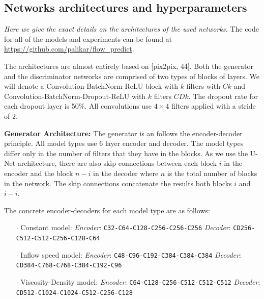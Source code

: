 \documentclass{llncs}
\begin{document}
\begin{subappendices}
\renewcommand{\thesection}{\Alph{section}}%

\section{Networks architectures and hyperparameters}
\label{app1}
\emph{Here we give the exact details on the architectures of the used networks.} The code for all of the models and experiments can be found at \url{https://github.com/palikar/flow_predict}.

The architectures are almost entirely based on [pix2pix, 44]. Both the generator and the discriminator networks are comprised of two types of blocks of layers. We will denote a Convolution-BatchNorm-ReLU block with $k$ filters with $Ck$ and Convolution-BatchNorm-Dropout-ReLU with $k$ filters $CDk$. The dropout rate for each dropout layer is 50\%. All convolutions use $4\times4$ filters applied with a stride of $2$.

\noindent\textbf{Generator Architecture:}
The generator is an follows the encoder-decoder principle. All model types use 6 layer encoder and decoder. The model types differ only in the number of filters that they have in the blocks. As we use the U-Net architecture, there are also skip connections between each block $i$ in the encoder and the block $n-i$ in the decoder where $n$ is the total number of blocks in the network. The skip connections concatenate the results both blocks $i$ and $i-i$.

The concrete encoder-decoders for each model type are as follows:
\begin{itemize}
\item[$\cdot$] Constant model:\newline
  \emph{Encoder}: \texttt{C32-C64-C128-C256-C256-C256}\newline
  \emph{Decoder}: \texttt{CD256-C512-C512-C256-C128-C64}
\item[$\cdot$] Inflow speed model:\newline
  \emph{Encoder}: \texttt{C48-C96-C192-C384-C384-C384}\newline
  \emph{Decoder}: \texttt{CD384-C768-C768-C384-C192-C96}
\item[$\cdot$] Viscosity-Density model:\newline
  \emph{Encoder}: \texttt{C64-C128-C256-C512-C512-C512} \newline
  \emph{Decoder}: \texttt{CD512-C1024-C1024-C512-C256-C128}
\end{itemize}


\end{subappendices}
\end{document}

